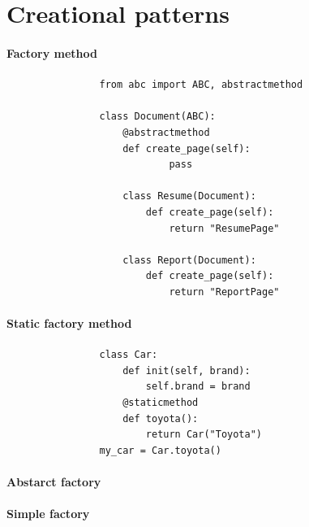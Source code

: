 \documentclass[a4paper]{article}
\title{}
\date{}
\begin{document}
    \maketitle
    
    
    \section{Creational patterns}
        
        \paragraph{Factory method}
            \begin{verbatim}
                from abc import ABC, abstractmethod
            
                class Document(ABC):
                    @abstractmethod
                    def create_page(self):
                            pass
            
                    class Resume(Document):
                        def create_page(self):
                            return "ResumePage"
            
                    class Report(Document):
                        def create_page(self):
                            return "ReportPage"
            \end{verbatim}
        
        \paragraph{Static factory method}
            
            \begin{verbatim}
                class Car:
                    def init(self, brand):
                        self.brand = brand
                    @staticmethod
                    def toyota():
                        return Car("Toyota")
                my_car = Car.toyota()
            \end{verbatim}
        
        \paragraph{Abstarct factory}
        
        \paragraph{Simple factory}
            
\end{document}
